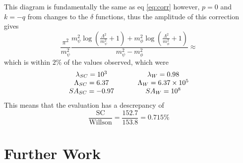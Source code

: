 \documentclass{article}
\begin{document}
	This diagram is fundamentally the same as eq \ref{eq:corr} however, $p=0$ and $k=-q$ from changes to the $\delta$ functions, thus the amplitude of this correction gives 
		\begin{equation}
			\frac{\pi^2 }{m_\psi^2} \frac{m_\psi^2 \log \left( \frac{\Lambda^2}{m^2_\psi} + 1 \right) +m_\phi^2 \log \left( \frac{\Lambda^2}{m^2_\phi} + 1 \right) }{m_\psi^2 - m_\phi^2} \approx 
		\end{equation}
		which is within $2\%$ of the values observed, which were 
		\begin{equation}
			\begin{array}{ccc}
				\lambda_{SC} = 10^3 & \hspace{0.5 cm} & \lambda_W = 0.98 \\
				\Lambda_{SC} = 6.37 & \hspace{0.5 cm} & \Lambda_W = 6.37 \times 10^5 \\
				SA_{SC} = -0.97 & \hspace{0.5 cm} & SA_W = 10^8 \\
			\end{array}
		\end{equation}
		This means that the evaluation has a descrepancy of 
		\begin{equation}
			\frac{\textrm{SC}}{\textrm{Willson}} = \frac{152.7}{153.8} = 0.715 \%
		\end{equation}

\newpage
\section{Further Work}
\end{document}
